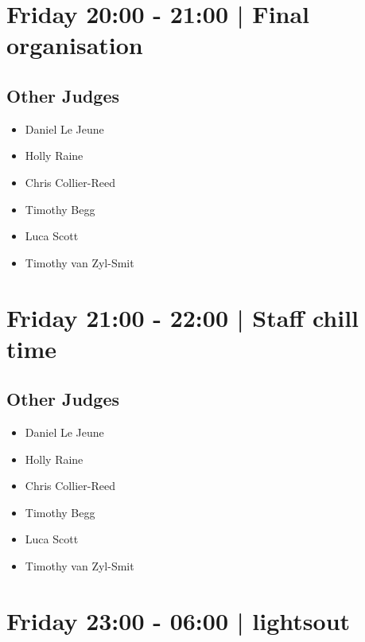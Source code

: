 \documentclass[10pt]{article}
\begin{document}
            \section*{Friday 20:00
        -
        21:00
        |
         Final organisation}
        
                
        \subsection*{Other Judges}
        
            \begin{itemize}
                            \item Daniel Le Jeune
                            \item Holly Raine
                            \item Chris Collier-Reed
                            \item Timothy Begg
                            \item Luca Scott
                            \item Timothy van Zyl-Smit
                        \end{itemize}
        

            \section*{Friday 21:00
        -
        22:00
        |
         Staff chill time}
        
                
        \subsection*{Other Judges}
        
            \begin{itemize}
                            \item Daniel Le Jeune
                            \item Holly Raine
                            \item Chris Collier-Reed
                            \item Timothy Begg
                            \item Luca Scott
                            \item Timothy van Zyl-Smit
                        \end{itemize}
        

            \section*{Friday 23:00
        -
        06:00
        |
         lightsout}
        
\end{document}
